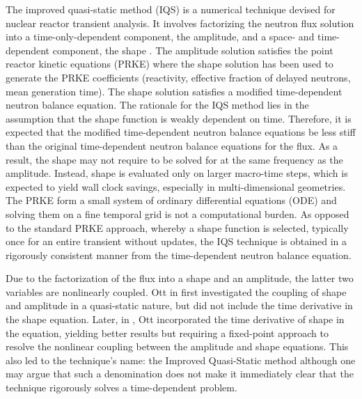 \documentclass{elsarticle}
\begin{document}
The improved quasi-static method (IQS) is a numerical technique devised for nuclear reactor transient analysis. It involves factorizing the neutron flux solution into a time-only-dependent component, the amplitude, and a space- and time-dependent component, the shape \cite{Ott_1966,Devooght_1984,Monier_diss,Sissaoui_1995,Dulla2008}. The amplitude solution satisfies the point reactor kinetic equations (PRKE) where the shape solution has been used to generate the PRKE coefficients (reactivity, effective fraction of delayed neutrons, mean generation time). The shape solution satisfies a modified time-dependent neutron balance equation. The rationale for the IQS method lies in the assumption that the shape function is weakly dependent on time. Therefore, it is expected that the modified time-dependent neutron balance equations be less stiff than the original time-dependent neutron balance equations for the flux. As a result, the shape may not require to be solved for at the same frequency as the amplitude. Instead, shape is evaluated only on larger macro-time steps, which is expected to yield wall clock savings, especially in multi-dimensional geometries. The PRKE form a small system of ordinary differential equations (ODE) and solving them on a fine temporal grid is not a computational burden. As opposed to the standard PRKE approach, whereby a shape function is selected, typically once for an entire transient without updates, the IQS technique is obtained in a rigorously consistent manner from the time-dependent neutron balance equation.

Due to the factorization of the flux into a shape and an amplitude, the latter two variables are nonlinearly coupled. Ott in \cite{Ott_1966} first investigated the coupling of shape and amplitude in a quasi-static nature, but did not include the time derivative in the shape equation. Later, in \cite{Ott_1969}, Ott incorporated the time derivative of shape in the equation, yielding better results but requiring a fixed-point approach to resolve the nonlinear coupling between the amplitude and shape equations. This also led to the technique's name: the Improved Quasi-Static method although one may argue that such a denomination does not make it immediately clear that the technique rigorously solves a time-dependent problem. 
\end{document}
